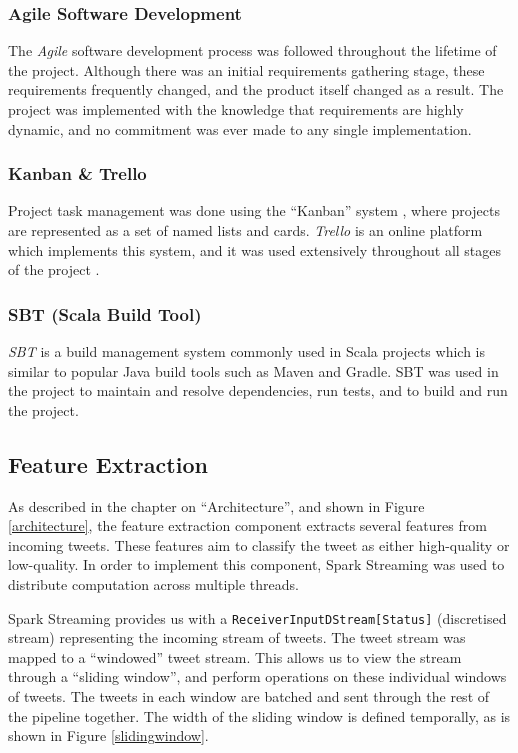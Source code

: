 \documentclass{l4proj}
\newcommand{\code}[1]{\texttt{#1}}
\begin{document}
             \subsubsection{Agile Software Development}
             The \textit{Agile} software development process was followed throughout the lifetime of the project. Although there was an initial requirements gathering stage, these requirements frequently changed, and the product itself changed as a result. The project was implemented with the knowledge that requirements are highly dynamic, and no commitment was ever made to any single implementation.
             
             \subsubsection{Kanban \& Trello}
             Project task management was done using the ``Kanban'' system \cite{kanban}, where projects are represented as a set of named lists and cards. \textit{Trello} is an online platform which implements this system, and it was used extensively throughout all stages of the project \cite{trello}.
         
             \subsubsection{SBT (Scala Build Tool)}
         \textit{SBT} is a build management system commonly used in Scala projects \cite{sbt} which is similar to popular Java build tools such as Maven and Gradle. SBT was used in the project to maintain and resolve dependencies, run tests, and to build and run the project.

    
    
    \subsection{Feature Extraction}
        
        As described in the chapter on ``Architecture'', and shown in Figure \ref{architecture}, the feature extraction component extracts several features from incoming tweets. These features aim to classify the tweet as either high-quality or low-quality. In order to implement this component, Spark Streaming was used to distribute computation across multiple threads.
        
        Spark Streaming provides us with a \code{ReceiverInputDStream[Status]} (discretised stream) representing the incoming stream of tweets. The tweet stream was mapped to a ``windowed'' tweet stream. This allows us to view the stream through a ``sliding window'', and perform operations on these individual windows of tweets. The tweets in each window are batched and sent through the rest of the pipeline together. The width of the sliding window is defined temporally, as is shown in Figure \ref{slidingwindow}.
        
\end{document}
